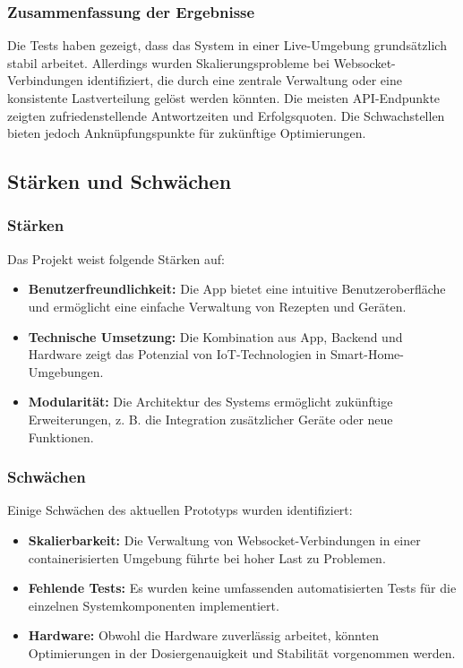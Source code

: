 \subsubsection*{Zusammenfassung der Ergebnisse}

Die Tests haben gezeigt, dass das System in einer Live-Umgebung grundsätzlich stabil arbeitet. Allerdings wurden Skalierungsprobleme bei Websocket-Verbindungen identifiziert, die durch eine zentrale Verwaltung oder eine konsistente Lastverteilung gelöst werden könnten. Die meisten API-Endpunkte zeigten zufriedenstellende Antwortzeiten und Erfolgsquoten. Die Schwachstellen bieten jedoch Anknüpfungspunkte für zukünftige Optimierungen.

\subsection{Stärken und Schwächen}

\subsubsection*{Stärken}

Das Projekt weist folgende Stärken auf:
\begin{itemize}
  \item \textbf{Benutzerfreundlichkeit:} Die App bietet eine intuitive Benutzeroberfläche und ermöglicht eine einfache Verwaltung von Rezepten und Geräten.
  \item \textbf{Technische Umsetzung:} Die Kombination aus App, Backend und Hardware zeigt das Potenzial von IoT-Technologien in Smart-Home-Umgebungen.
  \item \textbf{Modularität:} Die Architektur des Systems ermöglicht zukünftige Erweiterungen, z. B. die Integration zusätzlicher Geräte oder neue Funktionen.
\end{itemize}

\subsubsection*{Schwächen}

Einige Schwächen des aktuellen Prototyps wurden identifiziert:
\begin{itemize}
  \item \textbf{Skalierbarkeit:} Die Verwaltung von Websocket-Verbindungen in einer containerisierten Umgebung führte bei hoher Last zu Problemen.
  \item \textbf{Fehlende Tests:} Es wurden keine umfassenden automatisierten Tests für die einzelnen Systemkomponenten implementiert.
  \item \textbf{Hardware:} Obwohl die Hardware zuverlässig arbeitet, könnten Optimierungen in der Dosiergenauigkeit und Stabilität vorgenommen werden.
\end{itemize}

